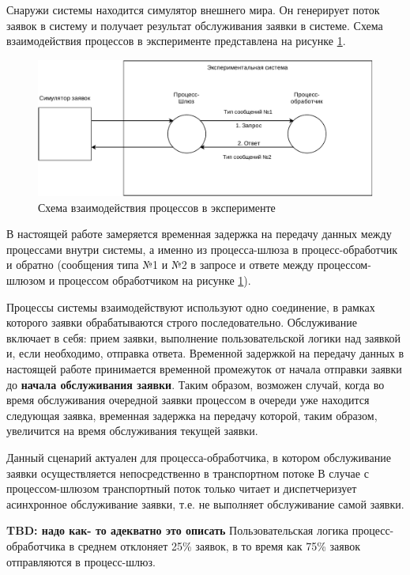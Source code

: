 Снаружи системы находится симулятор внешнего мира. Он генерирует поток заявок в систему и получает результат обслуживания заявки в системе. Схема взаимодействия процессов в эксперименте представлена на рисунке \ref{chapter41:SystemSchema}.

\begin{figure}[!h]
\caption{Схема взаимодействия процессов в эксперименте}
\label{chapter41:SystemSchema}
\includegraphics[width=\textwidth]{../../graphics/schemes/SystemSchema}
\end{figure}

В настоящей работе замеряется временная задержка на передачу данных между процессами внутри системы, а именно из процесса-шлюза в процесс-обработчик и обратно (сообщения типа №1 и №2 в запросе и ответе между процессом-шлюзом и процессом обработчиком на рисунке \ref{chapter41:SystemSchema}).

Процессы системы взаимодействуют используют одно соединение, в рамках которого заявки обрабатываются строго последовательно.
Обслуживание включает в себя: прием заявки, выполнение пользовательской логики над заявкой и, если необходимо, отправка ответа.
Временной задержкой на передачу данных в настоящей работе принимается временной промежуток от начала отправки заявки до \textbf{начала обслуживания заявки}. Таким образом, возможен случай, когда во время обслуживания очередной заявки процессом в очереди уже находится следующая заявка, временная задержка на передачу которой, таким образом, увеличится на время обслуживания текущей заявки.

Данный сценарий актуален для процесса-обработчика, в котором обслуживание заявки осуществляется непосредственно в транспортном потоке
В случае с процессом-шлюзом транспортный поток только читает и диспетчеризует асинхронное обслуживание заявки, т.е. не выполняет обслуживание самой заявки.

\textbf{TBD: надо как- то адекватно это описать}
Пользовательская логика процесс-обработчика в среднем отклоняет 25\% заявок, в то время как 75\% заявок отправляются в процесс-шлюз.

